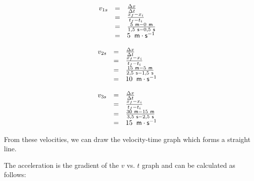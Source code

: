     \begin{equation}
    \begin{array}{ccc}\hfill {v}_{1s}& =& \frac{\Delta x}{\Delta t}\hfill \\ & =& \frac{{x}_{f}-{x}_{i}}{{t}_{f}-{t}_{i}}\hfill \\ & =& \frac{5\phantom{\rule{3.33333pt}{0ex}}\mathsf{m}-0\phantom{\rule{3.33333pt}{0ex}}\mathsf{m}}{1,5\phantom{\rule{3.33333pt}{0ex}}\mathsf{s}-0,5\phantom{\rule{3.33333pt}{0ex}}\mathsf{s}}\hfill \\ & =& 5\phantom{\rule{4pt}{0ex}}\phantom{\rule{0.166667em}{0ex}}\mathsf{m}\ensuremath{\cdot}{\mathsf{s}}^{-1}\hfill \end{array}
      \end{equation}
          \label{m38795*id72062}\nopagebreak\noindent{}
            
    \begin{equation}
    \begin{array}{ccc}\hfill {v}_{2s}& =& \frac{\Delta x}{\Delta t}\hfill \\ & =& \frac{{x}_{f}-{x}_{i}}{{t}_{f}-{t}_{i}}\hfill \\ & =& \frac{15\phantom{\rule{3.33333pt}{0ex}}\mathsf{m}-5\phantom{\rule{3.33333pt}{0ex}}\mathsf{m}}{2,5\phantom{\rule{3.33333pt}{0ex}}\mathsf{s}-1,5\phantom{\rule{3.33333pt}{0ex}}\mathsf{s}}\hfill \\ & =& 10\phantom{\rule{4pt}{0ex}}\phantom{\rule{0.166667em}{0ex}}\mathsf{m}\ensuremath{\cdot}{\mathsf{s}}^{-1}\hfill \end{array}
      \end{equation}
          \label{m38795*id72272}\nopagebreak\noindent{}
            
    \begin{equation}
    \begin{array}{ccc}\hfill {v}_{3s}& =& \frac{\Delta x}{\Delta t}\hfill \\ & =& \frac{{x}_{f}-{x}_{i}}{{t}_{f}-{t}_{i}}\hfill \\ & =& \frac{30\phantom{\rule{3.33333pt}{0ex}}\mathsf{m}-15\phantom{\rule{3.33333pt}{0ex}}\mathsf{m}}{3,5\phantom{\rule{3.33333pt}{0ex}}\mathsf{s}-2,5\phantom{\rule{3.33333pt}{0ex}}\mathsf{s}}\hfill \\ & =& 15\phantom{\rule{4pt}{0ex}}\phantom{\rule{0.166667em}{0ex}}\mathsf{m}\ensuremath{\cdot}{\mathsf{s}}^{-1}\hfill \end{array}
      \end{equation}
        \par 
        \label{m38795*id72478}From these velocities, we can draw the velocity-time graph which forms a straight line.\par 
        \label{m38795*id72482}The acceleration is the gradient of the $v$ vs. $t$ graph and can be calculated as follows:\par 
        \label{m38795*id72504}\nopagebreak\noindent{}
          
